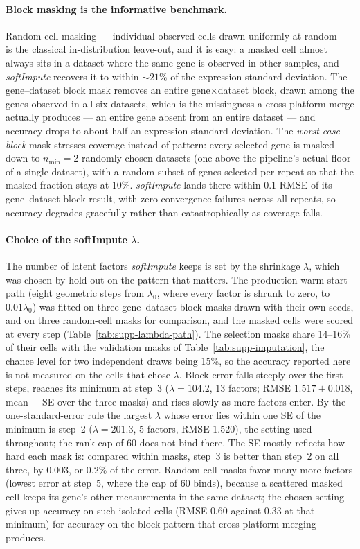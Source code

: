 \documentclass[11pt,a4paper]{article}
\begin{document}
\paragraph{Block masking is the informative benchmark.}
Random-cell masking --- individual observed cells drawn
uniformly at random --- is the classical in-distribution
leave-out, and it is easy: a masked cell almost always sits in a dataset
where the same gene is observed in other samples, and
\textit{softImpute} recovers it to within ${\sim}21\%$ of the
expression standard deviation. The gene--dataset block mask
removes an entire gene$\times$dataset block, drawn among the
genes observed in all six datasets, which is the
missingness a cross-platform merge actually produces --- an
entire gene absent from an entire dataset --- and accuracy
drops to about half an expression standard deviation. The
\emph{worst-case block} mask stresses coverage instead of
pattern: every selected gene is masked down to
$n_{\min} = 2$ randomly chosen datasets (one above the
pipeline's actual floor of a single dataset), with a random
subset of genes selected per repeat so that the masked
fraction stays at 10\%. \textit{softImpute} lands there within
$0.1$ RMSE of its gene--dataset block result, with zero
convergence failures across all repeats, so accuracy degrades
gracefully rather than catastrophically as coverage falls.

\paragraph{Choice of the softImpute $\lambda$.}
The number of latent factors \textit{softImpute} keeps is set by
the shrinkage $\lambda$, which was chosen by hold-out on the
pattern that matters. The production warm-start path (eight
geometric steps from $\lambda_0$, where every factor is shrunk
to zero, to $0.01\lambda_0$) was fitted on three gene--dataset
block masks drawn with their own seeds, and on three random-cell
masks for comparison, and the masked cells were scored at every
step (Table~\ref{tab:supp-lambda-path}). The selection masks
share 14--16\% of their cells with the validation masks of
Table~\ref{tab:supp-imputation}, the chance level for two
independent draws being 15\%, so the accuracy reported here is
not measured on the cells that chose $\lambda$. Block error
falls steeply over the first steps, reaches its minimum at step~3
($\lambda = 104.2$, 13 factors; RMSE $1.517 \pm 0.018$, mean
$\pm$ SE over the three masks) and rises slowly as more factors
enter. By the one-standard-error rule \citep{Hastie2009} the
largest $\lambda$ whose error lies within one SE of the minimum
is step~2 ($\lambda = 201.3$, 5 factors, RMSE $1.520$), the
setting used throughout; the rank cap of 60 does not bind
there. The SE mostly reflects how hard each mask is: compared
within masks, step~3 is better than step~2 on all three, by
$0.003$, or $0.2\%$ of the error. Random-cell masks favor many
more factors (lowest error at step~5, where the cap of 60
binds), because a scattered masked cell keeps its gene's other
measurements in the same dataset; the chosen setting gives up
accuracy on such isolated cells (RMSE $0.60$ against $0.33$ at
that minimum) for accuracy on the block pattern that
cross-platform merging produces.
\end{document}

